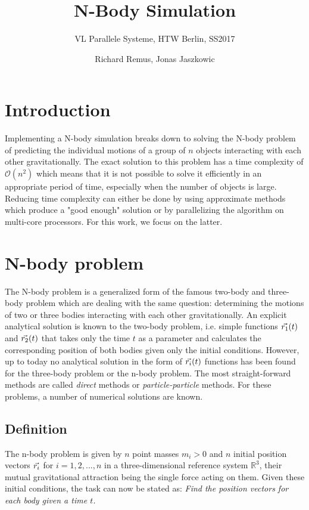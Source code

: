 \documentclass[a4paper,11pt]{scrartcl} %
\title{N-Body Simulation}
\subtitle{VL Parallele Systeme, HTW Berlin, SS2017}
\author{Richard Remus, Jonas Jaszkowic}
\date{}
\newcommand*{\vv}[1]{\vec{\mkern0mu#1}}
\begin{document}
\maketitle

\section{Introduction}
Implementing a N-body simulation breaks down to solving the N-body problem of predicting the individual motions of a group of $n$ objects interacting with each other gravitationally. The exact solution to this problem has a time complexity of $\mathcal{O}(n^2)$ which means that it is not possible to solve it efficiently in an appropriate period of time, especially when the number of objects is large. Reducing time complexity can either be done by using approximate methods which produce a "good enough" solution or by parallelizing the algorithm on multi-core processors. For this work, we focus on the latter.

\section{N-body problem}
The N-body problem is a generalized form of the famous two-body and three-body problem which are dealing with the same question: determining the motions of two or three bodies interacting with each other gravitationally. An explicit analytical solution is known to the two-body problem, i.e. simple functions $\vv{r_1}(t)$ and $\vv{r_2}(t)$ that takes only the time $t$ as a parameter and calculates the corresponding position of both bodies given only the initial conditions. However, up to today no analytical solution in the form of $\vv{r_i}(t)$ functions has been found for the three-body problem or the n-body problem. \cite{nbodysolve} The most straight-forward methods are called \textit{direct} methods or \textit{particle-particle} methods. For these problems, a number of numerical solutions are known.
\subsection{Definition}
The n-body problem is given by $n$ point masses $m_i > 0$ and $n$ initial position vectors $\vv{r_i}$ for $i=1,2,...,n$ in a three-dimensional reference system $\mathbb{R}^3$, their mutual gravitational attraction being the single force acting on them. \cite{meyer2008introduction}Given these initial conditions, the task can now be stated as: \textit{Find the position vectors for each body given a time $t$.}
\end{document}
